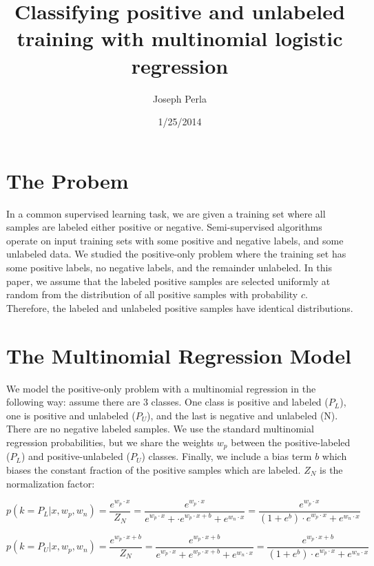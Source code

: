 \documentclass[]{article}
\begin{document}
\title{Classifying positive and unlabeled training  with multinomial logistic regression}
\author{Joseph Perla}
\date{1/25/2014}
\maketitle

\section{The Probem}
In a common supervised learning task, we are given a training set where all samples are labeled either positive or negative. Semi-supervised algorithms operate on input training sets with some positive and negative labels, and some unlabeled data.  We studied the positive-only problem where the training set has some positive labels, no negative labels, and the remainder unlabeled.  In this paper, we assume that the labeled positive samples are selected uniformly at random from the distribution of all positive samples with probability $c$. Therefore, the labeled and unlabeled positive samples have identical distributions.

\section{The Multinomial Regression Model}

We model the positive-only problem with a multinomial regression in the following way: assume there are 3 classes.  One class is positive and labeled ($P_L$), one is positive and unlabeled ($P_U$), and the last is negative and unlabeled (N).  There are no negative labeled samples.  We use the standard multinomial regression probabilities, but we share the weights $w_p$ between the positive-labeled ($P_L$) and positive-unlabeled ($P_U$) classes. Finally, we include a bias term $b$ which biases the constant fraction of the positive samples which are labeled.  $Z_N$ is the normalization factor:

$$
p(k=P_L | x, w_p, w_n) =  \frac{e^{w_p \cdot x}}{Z_N} = \frac{e^{w_p \cdot x}}{e^{w_p \cdot x} + \cdot e^{w_p \cdot x + b} + e^{w_n \cdot x}} = \frac{e^{w_p \cdot x}}{(1 + e^{b}) \cdot e^{w_p \cdot x} + e^{w_n \cdot x}}
$$

$$
p(k=P_U | x, w_p, w_n) =  \frac{e^{w_p \cdot x + b}}{Z_N} = \frac{e^{w_p \cdot x + b}}{e^{w_p \cdot x} + e^{w_p \cdot x + b} + e^{w_n \cdot x}} = \frac{e^{w_p \cdot x + b}}{(1 + e^{b}) \cdot e^{w_p \cdot x} + e^{w_n \cdot x}}
$$
\end{document}
